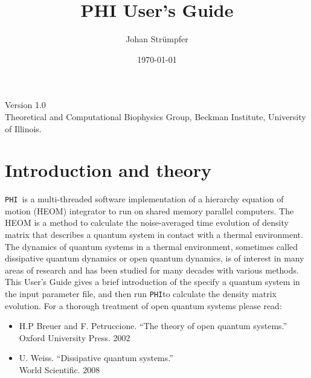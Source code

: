 \documentclass[11pt]{article}
\title{PHI User's Guide}
\author{Johan Str\"umpfer\vspace{2cm}}
\date{\today}                                           %
\newcommand{\PHI}{\texttt{PHI}}
\begin{document}
\maketitle
\begin{center}
Version 1.0\\
\vspace{1.0cm}
Theoretical and Computational Biophysics Group, Beckman Institute, University of Illinois. 
\end{center}

\clearpage
\tableofcontents
\clearpage
\section{Introduction and theory}
\PHI\ is a multi-threaded software implementation of a hierarchy equation of motion (HEOM) integrator to run on shared memory parallel computers. The HEOM is a method to calculate the noise-averaged time evolution of density matrix that describes a quantum system in contact with a thermal environment. The dynamics of quantum systems in a thermal environment, sometimes called dissipative quantum dynamics or open quantum dynamics, is of interest in many areas of research and has been studied for many decades with various methods. This User's Guide gives a brief introduction of the specify a quantum system in the input parameter file, and then run \PHI to calculate the density matrix evolution. For a thorough treatment of open quantum systems please read:
\begin{itemize}
\item H.P Breuer and F. Petruccione. ``The theory of open quantum systems.''\\ Oxford University Press. 2002
\item U. Weiss. ``Dissipative quantum systems.''\\ World Scientific. 2008
\end{itemize}
\end{document}
